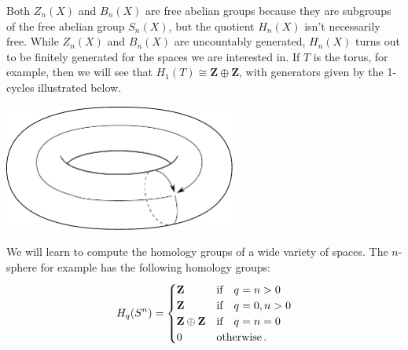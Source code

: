 Both $Z_n(X)$ and $B_n(X)$ are free abelian groups because they are subgroups of the free abelian group $S_n(X)$, but the quotient $H_n(X)$ isn't necessarily free. While $Z_n(X)$ and $B_n(X)$ are uncountably generated, $H_n(X)$ turns out to be finitely generated for the spaces we are interested in. If $T$ is the torus, for example, then we will see that $H_1(T) \cong \mathbf{Z} \oplus \mathbf{Z}$, with generators given by the 1-cycles illustrated below. 

\begin{center}
\includegraphics[width=3in]{905/Figures/01-torus-generating-cycles}
\end{center}

We will learn to compute the homology groups of a wide variety of spaces. 
The $n$-sphere for example has the following homology groups:
\[
H_q(S^n)=\begin{cases}\mathbf Z & \hbox{if}\quad q=n>0\\
                \mathbf Z & \hbox{if}\quad q=0,n>0\\
                \mathbf Z\oplus\mathbf Z & \hbox{if}\quad q=n=0\\
                0 & \hbox{otherwise}\,.
\end{cases}
\]





